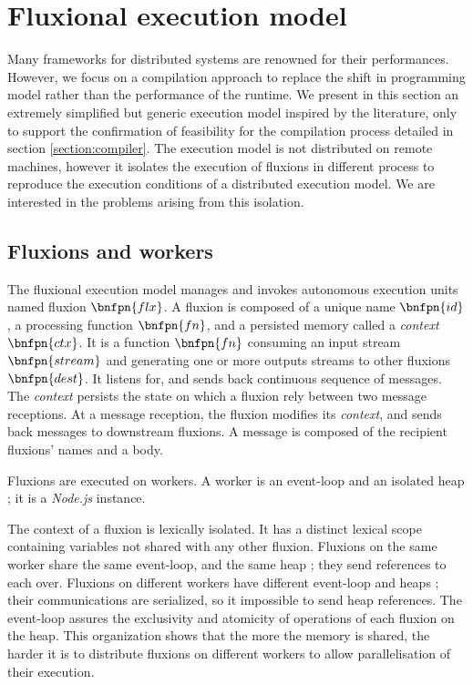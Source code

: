 \section{Fluxional execution model} \label{section:model}

Many frameworks for distributed systems are renowned for their performances\cite{Welsh2000, Jain2006, Wu2007, Zaharia2010, Akidau2013, Marz2011}.
However, we focus on a compilation approach to replace the shift in programming model rather than the performance of the runtime.
We present in this section an extremely simplified but generic execution model inspired by the literature, only to support the confirmation of feasibility for the compilation process detailed in section \ref{section:compiler}.
The execution model is not distributed on remote machines, however it isolates the execution of fluxions in different process to reproduce the execution conditions of a distributed execution model.
We are interested in the problems arising from this isolation.

\subsection{Fluxions and workers}

The fluxional execution model manages and invokes autonomous execution units named fluxion $\bnfpn{flx}$.
A fluxion is composed of a unique name $\bnfpn{id}$, a processing function $\bnfpn{fn}$, and a persisted memory called a \textit{context} $\bnfpn{ctx}$.
It is a function $\bnfpn{fn}$ consuming an input stream $\bnfpn{stream}$ and generating one or more outputs streams to other fluxions $\bnfpn{dest}$.
It listens for, and sends back continuous sequence of messages.
The \textit{context} persists the state on which a fluxion rely between two message receptions.
At a message reception, the fluxion modifies its \textit{context}, and sends back messages to downstream fluxions.
A message is composed of the recipient fluxions' names and a body.

Fluxions are executed on workers.
A worker is an event-loop and an isolated heap ; it is a \textit{Node.js} instance.

The context of a fluxion is lexically isolated.
It has a distinct lexical scope containing variables not shared with any other fluxion.
Fluxions on the same worker share the same event-loop, and the same heap ; they send references to each over.
Fluxions on different workers have different event-loop and heaps ; their communications are serialized, so it impossible to send heap references.
The event-loop assures the exclusivity and atomicity of operations of each fluxion on the heap.
This organization shows that the more the memory is shared, the harder it is to distribute fluxions on different workers to allow parallelisation of their execution.

